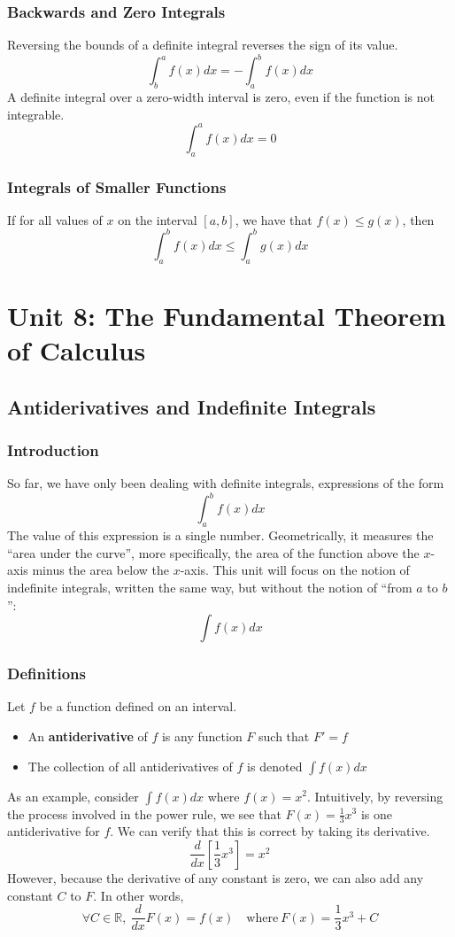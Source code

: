 \documentclass[10pt]{article}
\def\R{{\mathbb R}}
\newenvironment{definition}[1][]{\begin{tcolorbox}[colframe=_orange,colback=_orange2,title=Definition. \ifthenelse{\isempty{#1}}{}{(#1)}
]}{\end{tcolorbox}}
\begin{document}
\subsubsection{Backwards and Zero Integrals}
Reversing the bounds of a definite integral reverses the sign of its value.
$$
    \int_b^a f(x)dx = -\int_a^b f(x)dx
$$
A definite integral over a zero-width interval is zero, even if the function is not integrable.
$$
    \int_a^a f(x)dx=0
$$
\subsubsection{Integrals of Smaller Functions}
If for all values of $x$ on the interval $[a,b]$, we have that $f(x)\leq g(x)$, then
$$
    \int_a^b f(x)dx \leq \int_a^b g(x)dx
$$
\section{Unit 8: The Fundamental Theorem of Calculus}
\subsection{Antiderivatives and Indefinite Integrals}
\subsubsection{Introduction}
So far, we have only been dealing with definite integrals, expressions of the form
$$
    \int_a^bf(x)dx
$$
The value of this expression is a single number. Geometrically, it measures the ``area under the curve'', more specifically, the area of the function above the $x$-axis minus the area below the $x$-axis. This unit will focus on the notion of indefinite integrals, written the same way, but without the notion of ``from $a$ to $b$'':
$$
    \int f(x)dx
$$
\subsubsection{Definitions}
\begin{definition}
    Let $f$ be a function defined on an interval.
    \begin{itemize}
        \item An \textbf{antiderivative} of $f$ is any function $F$ such that $F'=f$
        \item The collection of all antiderivatives of $f$ is denoted $\displaystyle\int f(x)dx$
    \end{itemize}
\end{definition}
As an example, consider $\displaystyle \int f(x)dx$ where $f(x)=x^2$. Intuitively, by reversing the process involved in the power rule, we see that $F(x)=\frac{1}{3}x^3$ is one antiderivative for $f$. We can verify that this is correct by taking its derivative.
$$
    \frac{d}{dx}\left[\frac{1}{3}x^3\right]=x^2
$$
However, because the derivative of any constant is zero, we can also add any constant $C$ to $F$. In other words,
$$
    \forall C\in\R,~\frac{d}{dx}F(x)=f(x)\quad\text{where}~F(x)=\frac{1}{3}x^3+C
$$
\end{document}
